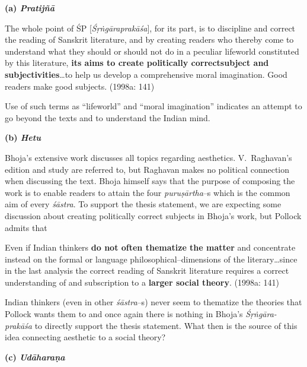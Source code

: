 
\textbf{(a) \textit{Pratijñā}}

\begin{myquote}
The whole point of ŚP [\textit{Śṛṅgāraprakāśa}], for its part, is to discipline and correct the reading of Sanskrit literature, and by creating readers who thereby come to understand what they should or should not do in a peculiar lifeworld constituted by this literature, \textbf{its aims to create politically correct}\textbf{subject and subjectivities}…to help us develop a comprehensive moral imagination. Good readers make good subjects. (1998a: 141)
\end{myquote}

Use of such terms as “lifeworld” and “moral imagination” indicates an attempt to go beyond the texts and to understand the Indian mind.

\textbf{(b) \textit{Hetu}}

Bhoja’s extensive work discusses all topics regarding aesthetics. V.~Raghavan’s edition and study are referred to, but Raghavan makes no political connection when discussing the text. Bhoja himself says that the purpose of composing the work is to enable readers to attain the four \textit{puruṣārtha}–s which is the common aim of every \textit{śāstra}. To support the thesis statement, we are expecting some discussion about creating politically correct subjects in Bhoja’s work, but Pollock admits that

\begin{myquote}
Even if Indian thinkers \textbf{do not often thematize the matter} and concentrate instead on the formal or language philosophical–dimensions of the literary…since in the last analysis the correct reading of Sanskrit literature requires a correct understanding of and subscription to a \textbf{larger social theory}. (1998a: 141)
\end{myquote}

Indian thinkers (even in other \textit{śāstra}–s) never seem to thematize the theories that Pollock wants them to and once again there is nothing in Bhoja’s \textit{Śṛṅgāra-prakāśa} to directly support the thesis statement. What then is the source of this idea connecting aesthetic to a social theory?

\textbf{(c) \textit{Udāharaṇa}}

